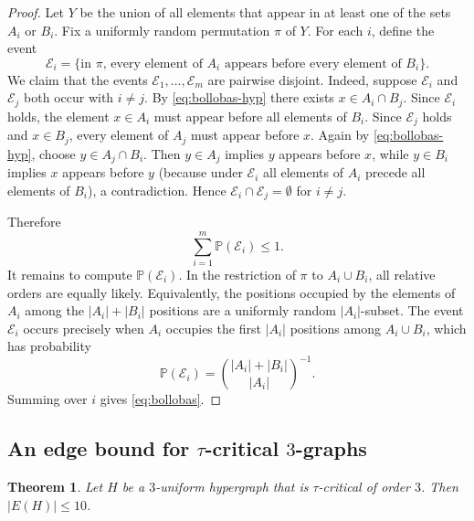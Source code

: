 \documentclass[11pt]{amsart}
\newtheorem{theorem}{Theorem}[section]
\theoremstyle{definition}
\theoremstyle{remark}
\newcommand{\cE}{\mathcal{E}}
\newcommand{\E}{E}
\begin{document}
\begin{proof}
Let $Y$ be the union of all elements that appear in at least one of the sets $A_i$ or $B_i$.
Fix a uniformly random permutation $\pi$ of $Y$.
For each $i$, define the event
\[
\cE_i=\{\text{in }\pi\text{, every element of }A_i\text{ appears before every element of }B_i\}.
\]
We claim that the events $\cE_1,\dots,\cE_m$ are pairwise disjoint.
Indeed, suppose $\cE_i$ and $\cE_j$ both occur with $i\neq j$.
By \eqref{eq:bollobas-hyp} there exists $x\in A_i\cap B_j$.
Since $\cE_i$ holds, the element $x\in A_i$ must appear before all elements of $B_i$.
Since $\cE_j$ holds and $x\in B_j$, every element of $A_j$ must appear before $x$.
Again by \eqref{eq:bollobas-hyp}, choose $y\in A_j\cap B_i$.
Then $y\in A_j$ implies $y$ appears before $x$, while $y\in B_i$ implies $x$ appears before $y$ (because under $\cE_i$ all elements of $A_i$ precede all elements of $B_i$), a contradiction.
Hence $\cE_i\cap \cE_j=\emptyset$ for $i\neq j$.

Therefore
\[
\sum_{i=1}^m \mathbb{P}(\cE_i)\le 1.
\]
It remains to compute $\mathbb{P}(\cE_i)$.
In the restriction of $\pi$ to $A_i\cup B_i$, all relative orders are equally likely.
Equivalently, the positions occupied by the elements of $A_i$ among the $|A_i|+|B_i|$ positions are a uniformly random $|A_i|$-subset.
The event $\cE_i$ occurs precisely when $A_i$ occupies the first $|A_i|$ positions among $A_i\cup B_i$, which has probability
\[
\mathbb{P}(\cE_i)=\binom{|A_i|+|B_i|}{|A_i|}^{-1}.
\]
Summing over $i$ gives \eqref{eq:bollobas}.
\end{proof}

\subsection{An edge bound for \texorpdfstring{$\tau$}{tau}-critical \texorpdfstring{$3$}{3}-graphs}

\begin{theorem}\label{thm:tau-main}
Let $H$ be a $3$-uniform hypergraph that is $\tau$-critical of order $3$.
Then $|\E(H)|\le 10$.
\end{theorem}
\end{document}
